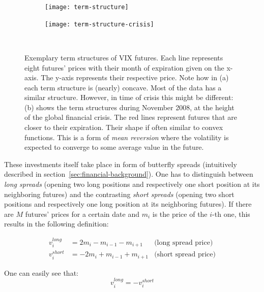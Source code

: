 \begin{figure}
	\centering
	\begin{subfigure}{0.45\linewidth}
		\texttt{[image: term-structure]}
		\caption{}
		\label{fig:term-structure-yearly}
	\end{subfigure}
	\begin{subfigure}{0.45\linewidth}
		\texttt{[image: term-structure-crisis]}
		\caption{}
		\label{fig:term-structure-crisis}
	\end{subfigure}\\
	\caption[Exemplary term structures of VIX futures]{%
		Exemplary term structures of VIX futures. Each line represents eight futures' prices with their month of expiration given on the x-axis. The y-axis represents their respective price. Note how in (a) each term structure is (nearly) concave. Most of the data has a similar structure. However, in time of crisis this might be different: (b) shows the term structures during November 2008, at the height of the global financial crisis. The red lines represent futures that are closer to their expiration. Their shape if often similar to convex functions. This is a form of \emph{mean reversion}{\footnotemark} where the volatility is expected to converge to some average value in the future.}
	\label{fig:term-structure}
\end{figure}

These investments itself take place in form of butterfly spreads (intuitively described in section~\ref{sec:financial-background}). One has to distinguish between \emph{long spreads} (opening two long positions and respectively one short position at its neighboring futures) and the contrasting \emph{short spreads} (opening two short positions and respectively one long position at its neighboring futures). If there are $M$ futures' prices for a certain date and $m_i$ is the price of the $i$-th one, this results in the following definition:

\begin{subequations}
	\begin{align}
		\label{eq:long-spread}
		v^{long}_i &= 2m_i - m_{i-1} - m_{i+1} & \text{(long spread price)}
		\\
		\label{eq:short-spread}
		v^{short}_i &= -2m_i + m_{i-1} + m_{i+1} & \text{(short spread price)}
	\end{align}
\end{subequations}

One can easily see that:
\begin{equation}
	\label{eq:spread-correlation}
	v^{long}_i = -v^{short}_i 
\end{equation}
 
